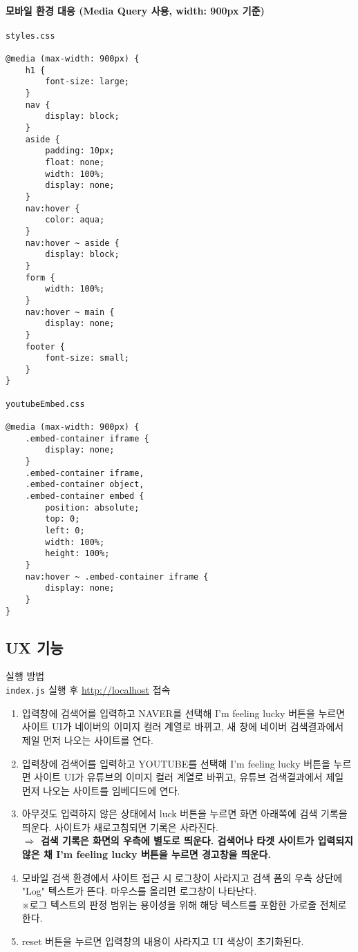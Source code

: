 \documentclass[a4paper, titlepage]{article}
\begin{document}
\paragraph{모바일 환경 대응 (Media Query 사용, width: 900px 기준)}
\begin{verbatim}
styles.css

@media (max-width: 900px) {
    h1 {
        font-size: large;
    }
    nav {
        display: block;
    }
    aside {
        padding: 10px;
        float: none;
        width: 100%;
        display: none;
    }
    nav:hover {
        color: aqua;
    }
    nav:hover ~ aside {
        display: block;
    }
    form {
        width: 100%;
    }
    nav:hover ~ main {
        display: none;
    }
    footer {
        font-size: small;
    }
}

youtubeEmbed.css

@media (max-width: 900px) {
    .embed-container iframe {
        display: none;
    }
    .embed-container iframe,
    .embed-container object,
    .embed-container embed {
        position: absolute;
        top: 0;
        left: 0;
        width: 100%;
        height: 100%;
    }
    nav:hover ~ .embed-container iframe {
        display: none;
    }
}
\end{verbatim}

\subsection{UX 기능}
실행 방법\\
\verb|index.js| 실행 후 \href{http://localhost}{http://localhost} 접속
\begin{enumerate}
    \item 입력창에 검색어를 입력하고 NAVER를 선택해 I'm feeling lucky 버튼을 누르면 사이트 UI가 네이버의 이미지 컬러 계열로 바뀌고, 새 창에 네이버 검색결과에서 제일 먼저 나오는 사이트를 연다.
    \item 입력창에 검색어를 입력하고 YOUTUBE를 선택해 I'm feeling lucky 버튼을 누르면 사이트 UI가 유튜브의 이미지 컬러 계열로 바뀌고, 유튜브 검색결과에서 제일 먼저 나오는 사이트를 임베디드에 연다.
    \item 아무것도 입력하지 않은 상태에서 luck 버튼을 누르면 화면 아래쪽에 검색 기록을 띄운다. 사이트가 새로고침되면 기록은 사라진다.\\
          \textbf{$\Longrightarrow$ 검색 기록은 화면의 우측에 별도로 띄운다. 검색어나 타겟 사이트가 입력되지 않은 채 I'm feeling lucky 버튼을 누르면 경고창을 띄운다.}
    \item 모바일 검색 환경에서 사이트 접근 시 로그창이 사라지고 검색 폼의 우측 상단에 "Log" 텍스트가 뜬다. 마우스를 올리면 로그창이 나타난다.\\
          ※로그 텍스트의 판정 범위는 용이성을 위해 해당 텍스트를 포함한 가로줄 전체로 한다.
    \item reset 버튼을 누르면 입력창의 내용이 사라지고 UI 색상이 초기화된다.
\end{enumerate}
\end{document}
